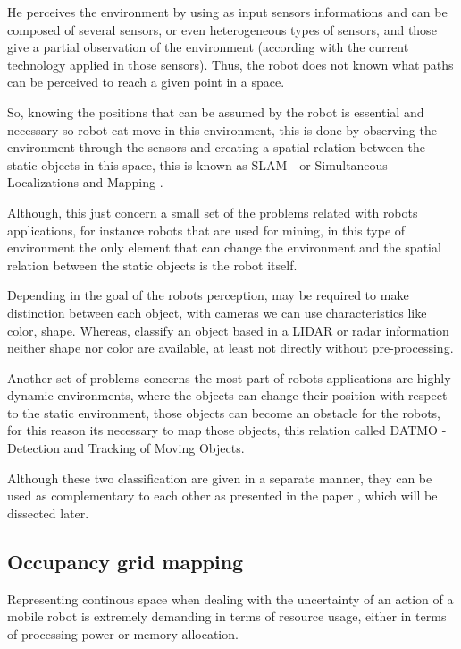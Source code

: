 He perceives the environment by using as input sensors informations and can be composed of several sensors, or even heterogeneous types of sensors, and those give a partial observation of the environment (according with the current technology applied in those sensors). Thus, the robot does not known what paths can be perceived to reach a given point in a space.

So, knowing the positions that can be assumed by the robot is essential and necessary so robot cat move in this environment, this is done by observing the environment through the sensors and creating a spatial relation between the static objects in this space, this is known as SLAM - or Simultaneous Localizations and Mapping \cite{iyengar1991autonomous}.

Although, this just concern a small set of the problems related with robots applications, for instance robots that are used for mining, in this type of environment the only element that can change the environment and the spatial relation between the static objects is the robot itself. 

Depending in the goal of the robots perception, may be required to make distinction between each object, with cameras we can use characteristics like color, shape. Whereas, classify an object based in a LIDAR or radar information neither shape nor color are available, at least not directly without pre-processing.

Another set of problems concerns the most part of robots applications are highly dynamic environments, where the objects can change their position with respect to the static environment, those objects can become an obstacle for the robots, for this reason its necessary to map those objects, this relation called DATMO - Detection and Tracking of Moving Objects.

Although these two classification are given in a separate manner, they can be used as complementary to each other as presented in the paper \cite{Wang04a}, which will be dissected later.

\subsection{Occupancy grid mapping}

Representing continous space when dealing with the uncertainty of an action of a mobile robot is extremely demanding in terms of resource usage, either in terms of processing power or memory allocation.

